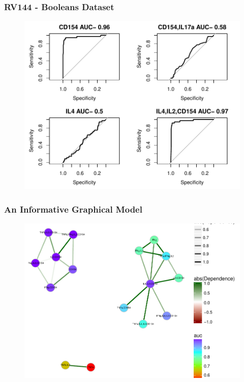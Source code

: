 \documentclass{beamer}
\makeatletter
\def\maxwidth{ %
  \ifdim\Gin@nat@width>\linewidth
    \linewidth
  \else
    \Gin@nat@width
  \fi
}
\theoremstyle{definition}
\makeatother
\begin{document}

\begin{frame}
\frametitle{RV144 - Booleans Dataset}
\begin{figure}[]
\includegraphics[width=\maxwidth]{figures/RV144newROCsmall}
\end{figure}
\end{frame}


\begin{frame}
\frametitle{An Informative Graphical Model}
\begin{figure}[]
\includegraphics[width= \maxwidth]{figures/rv144newNetworkAuc} 
\end{figure}
\end{frame}
\end{document}
